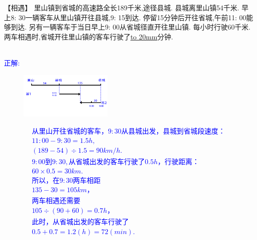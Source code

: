 \item {
    【相遇】
    里山镇到省城的高速路全长189千米,途径县城. 县城离里山镇54千米. 早上8: 30一辆客车从里山镇开往县城,9: 15到达. 停留15分钟后开往省城,午前11: 00能够到达. 另有一辆客车于当日早上9: 00从省城径直开往里山镇. 每小时行驶60千米. 两车相遇时,省城开往里山镇的客车行驶了\underline{\hbox to 20mm{}}分钟.
    \ifshowSolution 
        \fangsong{}\textcolor{blue}{
            \\正解: \\
            \begin{figure}[H] 
                \centering
                \includegraphics[width=0.4\textwidth]{./pics/Chapter_3/seikai_1.png}
            \end{figure}
            \begin{gather*}
                从里山开往省城的客车，9:30从县城出发，县城到省城段速度：\\
                    11:00 - 9:30 = 1.5 h,\\
                    (189-54)\div 1.5=90 km/h.\\
                9:00到9:30, 从省城出发的客车行驶了0.5h，行驶距离：\\
                    60\times 0.5 = 30km.\\
                所以，在9:30两车相距\\
                    135 - 30 = 105 km，\\
                两车相遇还需要\\
                105\div (90+60) = 0.7h，\\
                此时，从省城出发的客车行驶了\\
                0.5 + 0.7 = 1.2(h) = 72(min).
            \end{gather*}
        }
    \else
        \vspace{1cm}
    \fi
}

